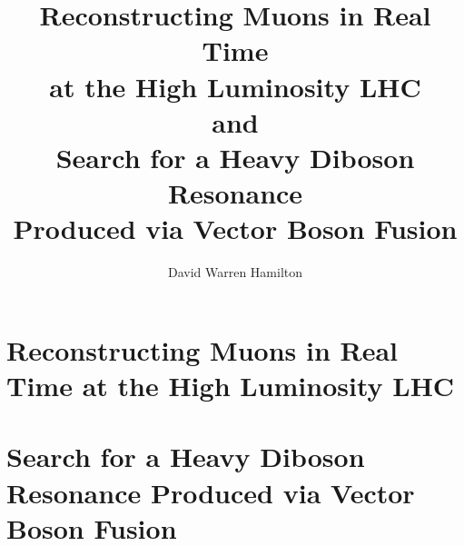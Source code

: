 \documentclass[PhD]{uclathes}
\title{
Reconstructing Muons in Real Time\\
at the High Luminosity LHC\\
and\\
Search for a Heavy Diboson Resonance\\
Produced via Vector Boson Fusion
}
\author{David Warren Hamilton}
\begin{document}
\makeintropages

\part{Reconstructing Muons in Real Time at the High Luminosity LHC}





\part{Search for a Heavy Diboson Resonance Produced via Vector Boson Fusion}








{}

\end{document}
